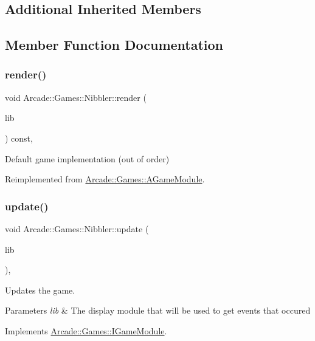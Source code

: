 \subsection*{Additional Inherited Members}


\subsection{Member Function Documentation}
\mbox{\label{classArcade_1_1Games_1_1Nibbler_afd52ee2fad66523b58f94f9eb582145e}} 
\subsubsection{\texorpdfstring{render()}{render()}}
{\footnotesize\ttfamily void Arcade\+::\+Games\+::\+Nibbler\+::render (\begin{DoxyParamCaption}\item[{\mbox{\hyperlink{classArcade_1_1Display_1_1IDisplayModule}{Arcade\+::\+Display\+::\+I\+Display\+Module}} \&}]{lib }\end{DoxyParamCaption}) const\hspace{0.3cm}{\ttfamily [final]}, {\ttfamily [virtual]}}

Default game implementation (out of order) 

Reimplemented from \mbox{\hyperlink{classArcade_1_1Games_1_1AGameModule_a5897780d42d5faba3287c29b87f2b498}{Arcade\+::\+Games\+::\+A\+Game\+Module}}.

\mbox{\label{classArcade_1_1Games_1_1Nibbler_a6a44a75ab1905647587d7a6314155955}} 
\subsubsection{\texorpdfstring{update()}{update()}}
{\footnotesize\ttfamily void Arcade\+::\+Games\+::\+Nibbler\+::update (\begin{DoxyParamCaption}\item[{const \mbox{\hyperlink{classArcade_1_1Display_1_1IDisplayModule}{Arcade\+::\+Display\+::\+I\+Display\+Module}} \&}]{lib }\end{DoxyParamCaption})\hspace{0.3cm}{\ttfamily [final]}, {\ttfamily [virtual]}}



Updates the game. 


\begin{DoxyParams}{Parameters}
{\em lib} & The display module that will be used to get events that occured \\
\hline
\end{DoxyParams}


Implements \mbox{\hyperlink{classArcade_1_1Games_1_1IGameModule_a421d1064fcc112dfc7ea025fc7f88aa7}{Arcade\+::\+Games\+::\+I\+Game\+Module}}.

